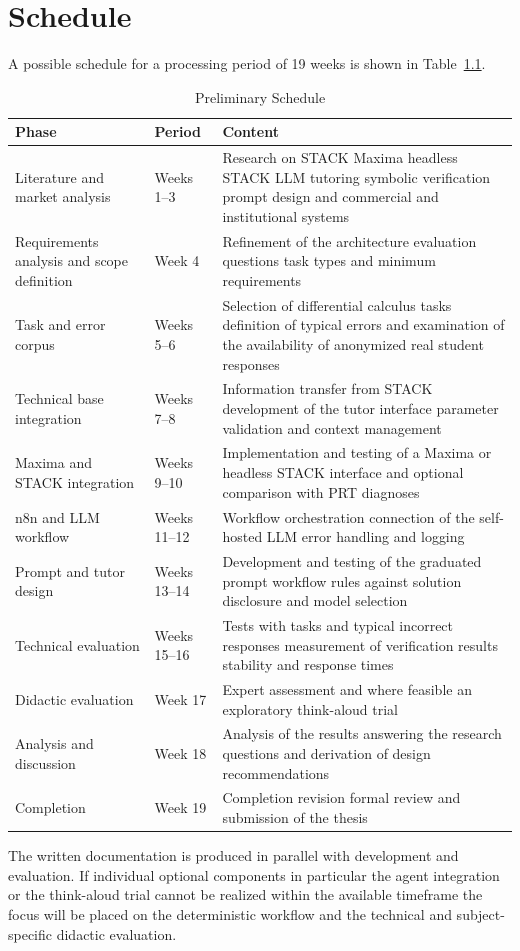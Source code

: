 \documentclass[11pt,a4paper,oneside,ngerman]{memoir}
\begin{document}
\chapter{Schedule}
A possible schedule for a processing period of 19 weeks is shown in Table~\ref{tab:zeitplan}.
\begin{table}[htbp]
\centering
\caption{Preliminary Schedule}
\label{tab:zeitplan}
\small
\begin{tabularx}{\textwidth}{@{}p{}p{}X@{}}
\toprule
\textbf{Phase} & \textbf{Period} & \textbf{Content} \\
\midrule
Literature and market analysis
& Weeks 1--3
& Research on STACK Maxima headless STACK LLM tutoring symbolic verification prompt design and commercial and institutional systems \\
\addlinespace
Requirements analysis and scope definition
& Week 4
& Refinement of the architecture evaluation questions task types and minimum requirements \\
\addlinespace
Task and error corpus
& Weeks 5--6
& Selection of differential calculus tasks definition of typical errors and examination of the availability of anonymized real student responses \\
\addlinespace
Technical base integration
& Weeks 7--8
& Information transfer from STACK development of the tutor interface parameter validation and context management \\
\addlinespace
Maxima and STACK integration
& Weeks 9--10
& Implementation and testing of a Maxima or headless STACK interface and optional comparison with PRT diagnoses \\
\addlinespace
n8n and LLM workflow
& Weeks 11--12
& Workflow orchestration connection of the self-hosted LLM error handling and logging \\
\addlinespace
Prompt and tutor design
& Weeks 13--14
& Development and testing of the graduated prompt workflow rules against solution disclosure and model selection \\
\addlinespace
Technical evaluation
& Weeks 15--16
& Tests with tasks and typical incorrect responses measurement of verification results stability and response times \\
\addlinespace
Didactic evaluation
& Week 17
& Expert assessment and where feasible an exploratory think-aloud trial \\
\addlinespace
Analysis and discussion
& Week 18
& Analysis of the results answering the research questions and derivation of design recommendations \\
\addlinespace
Completion
& Week 19
& Completion revision formal review and submission of the thesis \\
\bottomrule
\end{tabularx}
\end{table}
The written documentation is produced in parallel with development and evaluation. If individual optional components in particular the agent integration or the think-aloud trial cannot be realized within the available timeframe the focus will be placed on the deterministic workflow and the technical and subject-specific didactic evaluation.
\end{document}
